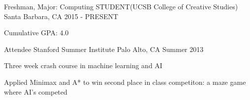 \begin{cventries}
  \cventry
    {Freshman, Major: Computing}
    {STUDENT(UCSB College of Creative Studies)}
    {Santa Barbara, CA}
    {2015 - PRESENT}
    {
      \begin{cvitems}
        \item {Cumulative GPA: 4.0}
      \end{cvitems}
    }
  \cventry
    {Attendee}
    {Stanford Summer Institute}
    {Palo Alto, CA}
    {Summer 2013}
    {
      \begin{cvitems}
        \item {Three week crash course in machine learning and AI}
        \item {Applied Minimax and A* to win second place in class competiton: a maze game where AI's competed}
      \end{cvitems}
    }
\end{cventries}
